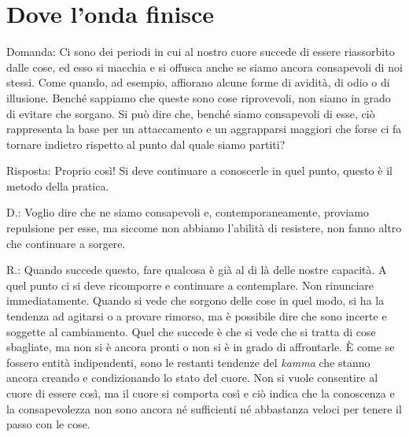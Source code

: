 \chapter{Dove l'onda finisce}

Domanda: Ci sono dei periodi in cui al nostro cuore succede di essere
riassorbito dalle cose, ed esso si macchia e si offusca anche se siamo
ancora consapevoli di noi stessi. Come quando, ad esempio, affiorano
alcune forme di avidità, di odio o di illusione. Benché sappiamo che
queste sono cose riprovevoli, non siamo in grado di evitare che sorgano.
Si può dire che, benché siamo consapevoli di esse, ciò rappresenta la
base per un attaccamento e un aggrapparsi maggiori che forse ci fa
tornare indietro rispetto al punto dal quale siamo partiti?

Risposta: Proprio così! Si deve continuare a conoscerle in quel punto,
questo è il metodo della pratica.

D.: Voglio dire che ne siamo consapevoli e, contemporaneamente, proviamo
repulsione per esse, ma siccome non abbiamo l'abilità di resistere, non
fanno altro che continuare a sorgere.

R.: Quando succede questo, fare qualcosa è già al di là delle nostre
capacità. A quel punto ci si deve ricomporre e continuare a contemplare.
Non rinunciare immediatamente. Quando si vede che sorgono delle cose in
quel modo, si ha la tendenza ad agitarsi o a provare rimorso, ma è
possibile dire che sono incerte e soggette al cambiamento. Quel che
succede è che si vede che si tratta di cose sbagliate, ma non si è
ancora pronti o non si è in grado di affrontarle. È come se fossero
entità indipendenti, sono le restanti tendenze del \emph{kamma} che
stanno ancora creando e condizionando lo stato del cuore. Non si vuole
consentire al cuore di essere così, ma il cuore si comporta così e ciò
indica che la conoscenza e la consapevolezza non sono ancora né
sufficienti né abbastanza veloci per tenere il passo con le cose.

